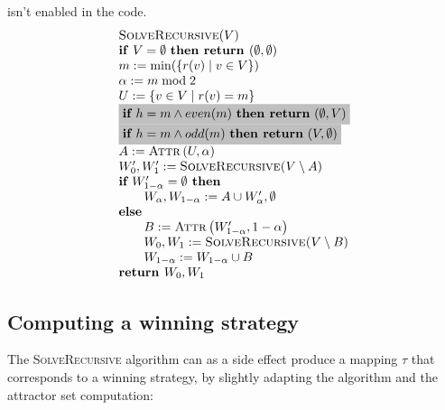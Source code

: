 \documentclass{article}
\begin{document}
isn't enabled in the code.
\begin{equation*}
\begin{array}{l}
\textsc{SolveRecursive}(V) \\ 
\text{\textbf{if} }V=\emptyset \text{ \textbf{then return }}(\emptyset
,\emptyset ) \\ 
m:=\min (\{r(v)\mid v\in V\}) \\ 
\alpha :=m \bmod 2 \\ 
U:=\{v\in V\mid r(v)=m\} \\ 
\colorbox{lightgray}{$
\textbf{if }h=m\wedge even(m)\text{ \textbf{then return} }(\emptyset,V) $}\\ 
\colorbox{lightgray}{$
\textbf{if }h=m\wedge odd(m)\text{ \textbf{then return} }(V,\emptyset) $}\\
A:=\text{\textsc{Attr}}\left( U,\alpha \right)  \\ 
W_{0}^{\prime },W_{1}^{\prime }:=\text{\textsc{SolveRecursive(}}V\setminus A%
\text{)} \\ 
\textbf{if } W_{1-\alpha }^{\prime }= \emptyset \textbf{ then} \\ 
\qquad W_{\alpha },W_{1-\alpha }:=A\cup W_{\alpha }^{\prime }, \emptyset \\ 
\text{\textbf{else}} \\ 
\qquad B:=\text{\textsc{Attr}}\left( W_{1-\alpha }^{\prime },1-\alpha \right)  \\ 
\qquad W_{0},W_{1}:=\text{\textsc{SolveRecursive(}}V\setminus B\text{)} \\ 
\qquad W_{1-\alpha }:=W_{1-\alpha }\cup B \\ 
\text{\textbf{return }}W_{0},W_{1}%
\end{array}%
\end{equation*}%


\subsection{Computing a winning strategy}

The \textsc{SolveRecursive} algorithm can as a side effect produce a mapping $\tau$ that
corresponds to a winning strategy, by slightly adapting the algorithm and the attractor set computation:
\end{document}
